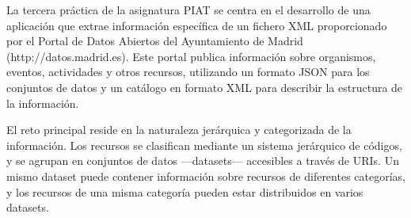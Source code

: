 





\noindent La tercera práctica de la asignatura PIAT %
se centra en el desarrollo de una aplicación que extrae información específica de un fichero XML proporcionado por el Portal de Datos Abiertos del Ayuntamiento de Madrid (http://datos.madrid.es). Este portal publica información sobre organismos, eventos, actividades y otros recursos, utilizando un formato JSON para los conjuntos de datos y un catálogo en formato XML para describir la estructura de la información.

El reto principal reside en la naturaleza jerárquica y categorizada de la información. Los recursos se clasifican mediante un sistema jerárquico de códigos, y se agrupan en conjuntos de datos ---datasets--- accesibles a través de URIs. Un mismo dataset puede contener información sobre recursos de diferentes categorías, y los recursos de una misma categoría pueden estar distribuidos en varios datasets.

